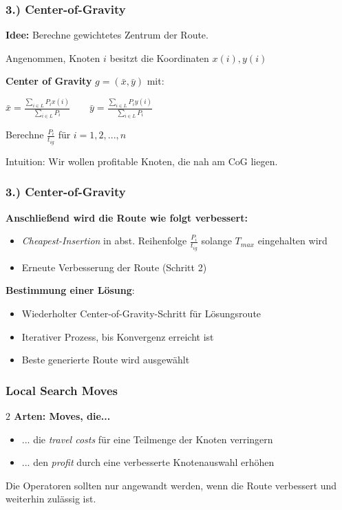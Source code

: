 \documentclass{beamer}
\begin{document}
\begin{frame}
  \frametitle{3.) Center-of-Gravity}
  \textbf{Idee:} Berechne gewichtetes Zentrum der Route.\newline

  Angenommen, Knoten $i$ besitzt die Koordinaten $x(i), y(i)$\newline

  \textbf{Center of Gravity} $g = (\bar{x}, \bar{y})$ mit:\newline

  $\bar{x} = \frac{\sum_{i \in L} P_i x(i)}{\sum_{i \in L} P_i} \quad\quad
  \bar{y} = \frac{\sum_{i \in L} P_i y(i)}{\sum_{i \in L} P_i}$\newline

  Berechne $\frac{P_i}{t_{ig}}$ für $i = 1, 2, ..., n$\newline

  Intuition: Wir wollen profitable Knoten, die nah am CoG liegen.
\end{frame}

\begin{frame}
  \frametitle{3.) Center-of-Gravity}
  \textbf{Anschließend wird die Route wie folgt verbessert:}
  \begin{itemize}
    \item \textit{Cheapest-Insertion} in abst. Reihenfolge $\frac{P_i}{t_{ig}}$ solange $T_{max}$ eingehalten wird
    \item Erneute Verbesserung der Route (Schritt 2)
  \end{itemize}
  \textbf{Bestimmung einer Lösung}:
  \begin{itemize}
    \item Wiederholter Center-of-Gravity-Schritt für Lösungsroute
    \item Iterativer Prozess, bis Konvergenz erreicht ist
    \item Beste generierte Route wird ausgewählt
  \end{itemize}
\end{frame}

\begin{frame}
  \frametitle{Local Search Moves}
  \textbf{$2$ Arten: Moves, die...}
  \begin{itemize}
    \item ... die \textit{travel costs} für eine Teilmenge der Knoten verringern
    \item ... den \textit{profit} durch eine verbesserte Knotenauswahl erhöhen
  \end{itemize}
  Die Operatoren sollten nur angewandt werden, wenn die Route verbessert und weiterhin zulässig ist.
\end{frame}
\end{document}

